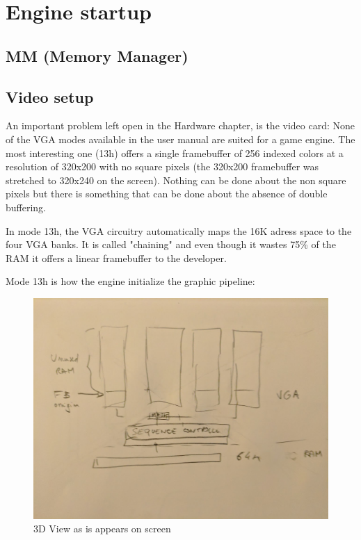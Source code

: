 \documentclass[book.tex]{subfiles}
\begin{document}
\section{Engine startup}
\subsection{MM (Memory Manager)}


\subsection{Video setup}
An important problem left open in the Hardware chapter, is the video card: None of the VGA modes available in the user manual are suited for a game engine. The most interesting one (13h) offers a single framebuffer of 256 indexed colors at a resolution of 320x200 with no square pixels (the 320x200 framebuffer was stretched to 320x240 on the screen). Nothing can be done about the non square pixels but there is something that can be done about the absence of double buffering.\\
\par
 In mode 13h, the VGA circuitry automatically maps the 16K adress space to the four VGA banks. It is called "chaining" and even though it wastes 75\% of the RAM it offers a linear framebuffer to the developer.\\
 \par
 Mode 13h is how the engine initialize the graphic pipeline:\\
 \begin{minipage}{\textwidth}

\end{minipage}
 \par
\begin{figure}[H]
\centering
 \includegraphics[width=\textwidth]{imgs/vga_layout/wasted_vga_ram.png}
 \caption{3D View as is appears on screen} \label{fig:vga_layout_in_3D}
 \end{figure}
\end{document}
